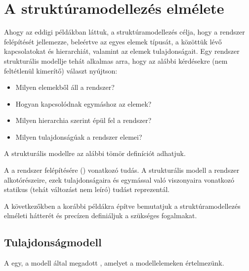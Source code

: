 \section{A struktúramodellezés elmélete}


Ahogy az eddigi példákban láttuk, a struktúramodellezés célja, hogy a rendszer felépítését jellemezze, beleértve az egyes elemek típusát, a közöttük lévő kapcsolatokat és hierarchiát, valamint az elemek tulajdonságait. Egy rendszer strukturális modellje tehát alkalmas arra, hogy az alábbi kérdésekre (nem feltétlenül kimerítő) választ nyújtson:

\begin{itemize}
	\item Milyen elemekből áll a rendszer?
	\item Hogyan kapcsolódnak egymáshoz az elemek?
	\item Milyen hierarchia szerint épül fel a rendszer?
	\item Milyen tulajdonságúak a rendszer elemei?
\end{itemize}


A strukturális modellre az alábbi tömör definíciót adhatjuk.

\begin{definicio}
	A  a rendszer felépítésére () vonatkozó tudás. A strukturális modell a rendszer alkotórészeire, ezek tulajdonságaira és egymással való viszonyaira vonatkozó statikus (tehát változást nem leíró) tudást reprezentál. %
\end{definicio}


A következőkben a korábbi példákra építve bemutatjuk a struktúramodellezés elméleti hátterét és precízen definiáljuk a szükséges fogalmakat.

\subsection{Tulajdonságmodell}

\begin{definicio}
	A  egy, a modell által megadott , amelyet a modellelemeken értelmezünk.
\end{definicio}

